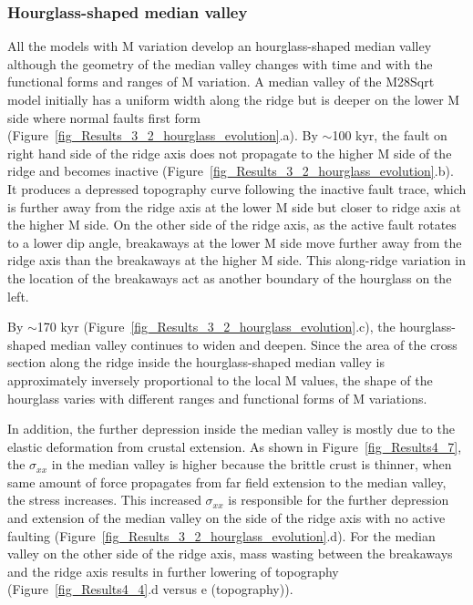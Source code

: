 \documentclass[draft,gc]{agutex}
\begin{document}
\begin{article}
\subsubsection{Hourglass-shaped median valley}
All the models with M variation develop an hourglass-shaped median valley although the geometry of the median valley changes with time and with the functional forms and ranges of M variation. A median valley of the M28Sqrt model initially has a uniform width along the ridge but is deeper on the lower M side where normal faults first form (Figure~\ref{fig_Results_3_2_hourglass_evolution}.a). By $\sim$100 kyr, the fault on right hand side of the ridge axis does not propagate to the higher M side of the ridge and becomes inactive (Figure~\ref{fig_Results_3_2_hourglass_evolution}.b). It produces a depressed topography curve following the inactive fault trace, which is further away from the ridge axis at the lower M side but closer to ridge axis at the higher M side. On the other side of the ridge axis, as the active fault rotates to a lower dip angle, breakaways at the lower M side move further away from the ridge axis than the breakaways at the higher M side. This along-ridge variation in the location of the breakaways act as another boundary of the hourglass on the left.

By $\sim$170 kyr (Figure~\ref{fig_Results_3_2_hourglass_evolution}.c), the hourglass-shaped median valley continues to widen and deepen. Since the area of the cross section along the ridge inside the hourglass-shaped median valley is approximately inversely proportional to the local M values, the shape of the hourglass varies with different ranges and functional forms of M variations.

In addition, the further depression inside the median valley is mostly due to the elastic deformation from crustal extension. As shown in Figure~\ref{fig_Results4_7}, the $\sigma_{xx}$ in the median valley is higher because the brittle crust is thinner, when same amount of force propagates from far field extension to the median valley, the stress increases. This increased $\sigma_{xx}$ is responsible for the further depression and extension of the median valley on the side of the ridge axis with no active faulting (Figure~\ref{fig_Results_3_2_hourglass_evolution}.d). For the median valley on the other side of the ridge axis, mass wasting between the breakaways and the ridge axis results in further lowering of topography (Figure~\ref{fig_Results4_4}.d versus e (topography)). 


\end{article}
\end{document}

